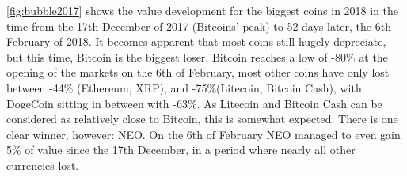 \documentclass[11pt,a4paper,compsoc,conference]{IEEEtran}
\begin{document}
\autoref{fig:bubble2017} shows the value development for the biggest coins in 2018 in the time from the 17th December of 2017 (Bitcoins' peak) to 52 days later, the 6th February of 2018. It becomes apparent that most coins still hugely depreciate, but this time, Bitcoin is the biggest loser. Bitcoin reaches a low of \mbox{-80\%} at the opening of the markets on the 6th of February, most other coins have only lost between -44\% (Ethereum, XRP), and -75\%(Litecoin, Bitcoin Cash), with DogeCoin sitting in between with -63\%. As Litecoin and Bitcoin Cash can be considered as relatively close to Bitcoin, this is somewhat expected. 
There is one clear winner, however: NEO. On the 6th of February NEO managed to even gain 5\% of value since the 17th December, in a period where nearly all other currencies lost. 

\begin{table}
\centering
{}
\end{table}
\end{document}
